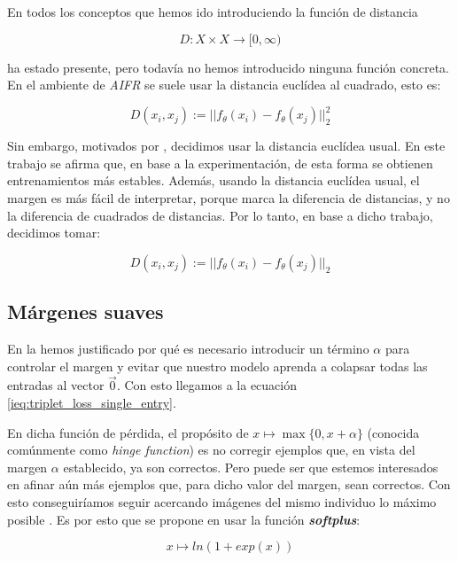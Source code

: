 En todos los conceptos que hemos ido introduciendo la función de distancia

\begin{equation}
    D: X \times X \to [0, \infty)
\end{equation}

ha estado presente, pero todavía no hemos introducido ninguna función concreta. En el ambiente de \textit{AIFR} se suele usar la distancia euclídea al cuadrado, esto es:

\begin{equation}
    D(x_i, x_j) := ||f_{\theta}(x_i) - f_{\theta}(x_j)||^2_2
\end{equation}

Sin embargo, motivados por \cite{informatica:principal}, decidimos usar la distancia euclídea usual. En este trabajo se afirma que, en base a la experimentación, de esta forma se obtienen entrenamientos más estables. Además, usando la distancia euclídea usual, el margen es más fácil de interpretar, porque marca la diferencia de distancias, y no la diferencia de cuadrados de distancias. Por lo tanto, en base a dicho trabajo, decidimos tomar:

\begin{equation}
        D(x_i, x_j) := ||f_{\theta}(x_i) - f_{\theta}(x_j)||_2
\end{equation}

\subsection{Márgenes suaves} \label{isec:margenes_suaves}

En la  hemos justificado por qué es necesario introducir un término $\alpha$ para controlar el margen y evitar que nuestro modelo aprenda a colapsar todas las entradas al vector $\vec{0}$. Con esto llegamos a la ecuación \eqref{ieq:triplet_loss_single_entry}.

En dicha función de pérdida, el propósito de $x \mapsto \max\{0, x + \alpha\}$ (conocida comúnmente como \textit{hinge function}) es no corregir ejemplos que, en vista del margen $\alpha$ establecido, ya son correctos. Pero puede ser que estemos interesados en afinar aún más ejemplos que, para dicho valor del margen, sean correctos. Con esto conseguiríamos seguir acercando imágenes del mismo individuo lo máximo posible \cite{informatica:principal}. Es por esto que se propone en usar la función \textbf{\textit{softplus}}:

\begin{equation}
    x \mapsto ln(1 + exp(x))
\end{equation}

